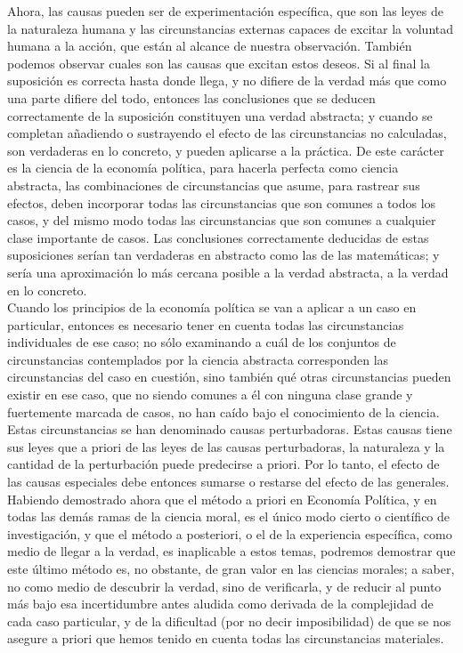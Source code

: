 Ahora, las causas pueden ser de experimentación específica, que son las leyes de la naturaleza humana y las circunstancias externas capaces de excitar la voluntad humana a la acción, que están al alcance de nuestra observación. También podemos observar cuales son las causas que excitan estos deseos. Si al final la suposición es correcta hasta donde llega, y no difiere de la verdad más que como una parte difiere del todo, entonces las conclusiones que se deducen correctamente de la suposición constituyen una verdad abstracta; y cuando se completan añadiendo o sustrayendo el efecto de las circunstancias no calculadas, son verdaderas en lo concreto, y pueden aplicarse a la práctica. De este carácter es la ciencia de la economía política, para hacerla perfecta como ciencia abstracta, las combinaciones de circunstancias que asume, para rastrear sus efectos, deben incorporar todas las circunstancias que son comunes a todos los casos, y del mismo modo todas las circunstancias que son comunes a cualquier clase importante de casos. Las conclusiones correctamente deducidas de estas suposiciones serían tan verdaderas en abstracto como las de las matemáticas; y sería una aproximación lo más cercana posible a la verdad abstracta, a la verdad en lo concreto.\\

Cuando los principios de la economía política se van a aplicar a un caso en particular, entonces es necesario tener en cuenta todas las circunstancias individuales de ese caso; no sólo examinando a cuál de los conjuntos de circunstancias contemplados por la ciencia abstracta corresponden las circunstancias del caso en cuestión, sino también qué otras circunstancias pueden existir en ese caso, que no siendo comunes a él con ninguna clase grande y fuertemente marcada de casos, no han caído bajo el conocimiento de la ciencia. Estas circunstancias se han denominado causas perturbadoras. Estas causas tiene sus leyes que a priori de las leyes de las causas perturbadoras, la naturaleza y la cantidad de la perturbación puede predecirse a priori. Por lo tanto, el efecto de las causas especiales debe entonces sumarse o restarse del efecto de las generales. \\

Habiendo demostrado ahora que el método a priori en Economía Política, y en todas las demás ramas de la ciencia moral, es el único modo cierto o científico de investigación, y que el método a posteriori, o el de la experiencia específica, como medio de llegar a la verdad, es inaplicable a estos temas, podremos demostrar que este último método es, no obstante, de gran valor en las ciencias morales; a saber, no como medio de descubrir la verdad, sino de verificarla, y de reducir al punto más bajo esa incertidumbre antes aludida como derivada de la complejidad de cada caso particular, y de la dificultad (por no decir imposibilidad) de que se nos asegure a priori que hemos tenido en cuenta todas las circunstancias materiales.\\

